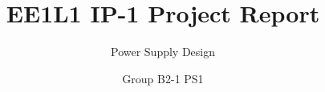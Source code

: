 \documentclass[whitelogo,oneside]{tudelft-report}
\newcommand{\productName}{Power Supply Design}
\newcommand{\groupNumber}{B2-1 PS1}
\begin{document}
 




\frontmatter

\title[tudelft-white]{EE1L1 IP-1 Project Report}
\subtitle[tudelft-black]{\productName}
\author[tudelft-white]{Group \groupNumber}




% 

% 

\tableofcontents

\mainmatter








\printbibliography


%
 
\appendix




\end{document}
